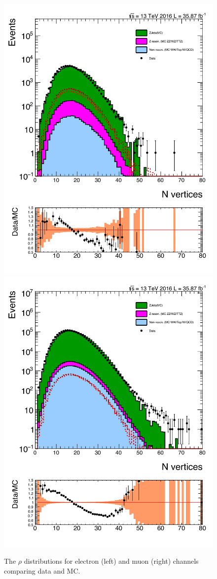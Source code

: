 \begin{figure}[htbp!]
\centering
\includegraphics[width=0.46\linewidth, page=2]{figures/ReMiniSummer16_MC_GMCPhPtWt_tightzpt50_puWeightsummer16_metfilter_unblind_el_log_1pb.pdf}
\includegraphics[width=0.46\linewidth, page=2]{figures/ReMiniSummer16_MC_GMCPhPtWt_tightzpt50_puWeightsummer16_metfilter_unblind_mu_log_1pb.pdf}
\caption{The $\rho$ distributions for electron (left) and muon (right) channels comparing data and MC.}
\label{fig:mc_rho}
\end{figure}

